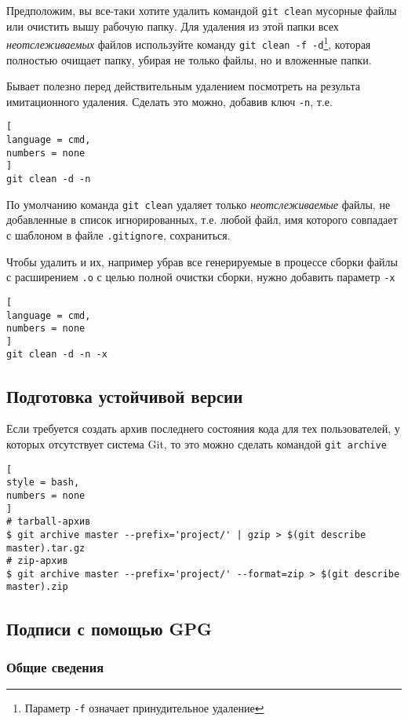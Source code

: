 \documentclass[%
	11pt,
	a4paper,
	utf8,
		]{article}
\begin{document}
Предположим, вы все-таки хотите удалить командой \lstinline{git clean} мусорные файлы или очистить вышу рабочую папку. Для удаления из этой папки всех \emph{неотслеживаемых} файлов используйте команду \lstinline{git clean -f -d}\footnote{Параметр \lstinline{-f} означает принудительное удаление}, которая полностью очищает папку, убирая не только файлы, но и вложенные папки.

Бывает полезно перед действительным удалением посмотреть на результа имитационного удаления. Сделать это можно, добавив ключ \lstinline{-n}, т.е.


\begin{lstlisting}[
language = cmd,
numbers = none
]
git clean -d -n
\end{lstlisting}

По умолчанию команда \lstinline{git clean} удаляет только \emph{неотслеживаемые} файлы, не добавленные в список игнорированных, т.е. любой файл, имя которого совпадает с шаблоном в файле \texttt{.gitignore}, сохраниться.

Чтобы удалить и их, например убрав все генерируемые в процессе сборки файлы с расширением \texttt{.o} с целью полной очистки сборки, нужно добавить параметр \lstinline{-x}


\begin{lstlisting}[
language = cmd,
numbers = none
]
git clean -d -n -x
\end{lstlisting}


\subsection{Подготовка устойчивой версии}

Если требуется создать архив последнего состояния кода для тех пользователей, у которых отсутствует система Git, то это можно сделать командой \texttt{git archive}
\begin{lstlisting}[
style = bash,
numbers = none
]
# tarball-архив
$ git archive master --prefix='project/' | gzip > $(git describe master).tar.gz
# zip-архив
$ git archive master --prefix='project/' --format=zip > $(git describe master).zip
\end{lstlisting}



\subsection{Подписи с помощью GPG}

\subsubsection{Общие сведения}
\end{document}

